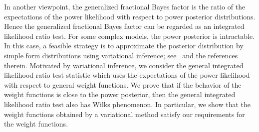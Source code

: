 \documentclass[11pt]{article}
\theoremstyle{plain}
\theoremstyle{definition}
\theoremstyle{remark}
\begin{document}




In another viewpoint,
the generalized fractional Bayes factor is the ratio of the expectations of the power likelihood with respect to power posterior distributions.
Hence the generalized fractional Bayes factor can be regarded as an integrated likelihood ratio test.
For some complex models, the power posterior is intractable.
In this case, 
a feasible strategy is to approximate the posterior distribution by simple form distributions using variational inference; see~\cite{blei2017} and the references therein.
Motivated by variational inference, we consider the general integrated likelihood ratio test statistic which uses the expectations of the power likelihood with respect to general weight functions.
We prove that if the behavior of the weight functions is close to the power posterior, then the general integrated likelihood ratio test also has Wilks phenomenon.
In particular, we show that the weight functions obtained by a variational method satisfy our requirements for the weight functions.
\end{document}
